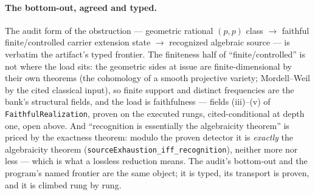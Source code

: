 \documentclass[11pt]{article}
\theoremstyle{definition}
\theoremstyle{remark}
\begin{document}
\paragraph{The bottom-out, agreed and typed.} The audit form of the
obstruction --- geometric rational $(p,p)$ class $\to$ faithful
finite/controlled carrier extension state $\to$ recognized algebraic source
--- is verbatim the artifact's typed frontier. The finiteness half of
``finite/controlled'' is not where the load sits: the geometric sides at
issue are finite-dimensional by their own theorems (the cohomology of a
smooth projective variety; Mordell--Weil by the cited classical input), so
finite support and distinct frequencies are the bank's structural fields,
and the load is faithfulness --- fields (iii)--(v) of
\texttt{FaithfulRealization}, proven on the executed rungs,
cited-conditional at depth one, open above. And ``recognition is essentially
the algebraicity theorem'' is priced by the exactness theorem: modulo the
proven detector it is \emph{exactly} the algebraicity theorem
(\texttt{sourceExhaustion\_iff\_recognition}), neither more nor less ---
which is what a lossless reduction means. The audit's bottom-out and the
program's named frontier are the same object; it is typed, its transport is
proven, and it is climbed rung by rung.
\end{document}

